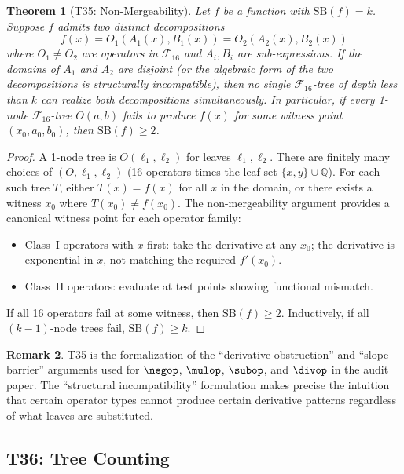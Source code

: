 \documentclass[12pt,a4paper]{article}
\newtheorem{theorem}{Theorem}[section]
\theoremstyle{definition}
\newtheorem{remark}[theorem]{Remark}
\newcommand{\F}{\mathcal{F}_{16}}
\newcommand{\SB}{\mathrm{SB}}
\begin{document}
\begin{theorem}[T35: Non-Mergeability]
\label{thm:T35}
Let $f$ be a function with $\SB(f) = k$.  Suppose $f$ admits two distinct
decompositions
\[
  f(x) = O_1(A_1(x), B_1(x)) = O_2(A_2(x), B_2(x))
\]
where $O_1 \ne O_2$ are operators in $\F$ and $A_i, B_i$ are sub-expressions.
If the domains of $A_1$ and $A_2$ are disjoint (or the algebraic form of the
two decompositions is structurally incompatible), then no single $\F$-tree
of depth less than $k$ can realize both decompositions simultaneously.
In particular, if every 1-node $\F$-tree $O(a,b)$ fails to produce $f(x)$
for some witness point $(x_0,a_0,b_0)$, then $\SB(f) \ge 2$.
\end{theorem}

\begin{proof}
A 1-node tree is $O(\ell_1, \ell_2)$ for leaves $\ell_1, \ell_2$.  There
are finitely many choices of $(O, \ell_1, \ell_2)$ (16 operators times the
leaf set $\{x, y\} \cup \mathbb{Q}$).  For each such tree $T$, either
$T(x) = f(x)$ for all $x$ in the domain, or there exists a witness $x_0$
where $T(x_0) \ne f(x_0)$.  The non-mergeability argument provides a canonical
witness point for each operator family:
\begin{itemize}
  \item Class~I operators with $x$ first: take the derivative at any $x_0$;
    the derivative is exponential in $x$, not matching the required $f'(x_0)$.
  \item Class~II operators: evaluate at test points showing functional mismatch.
\end{itemize}
If all 16 operators fail at some witness, then $\SB(f) \ge 2$.  Inductively,
if all $(k-1)$-node trees fail, $\SB(f) \ge k$.
\end{proof}

\begin{remark}
T35 is the formalization of the ``derivative obstruction'' and ``slope barrier''
arguments used for $\negop$, $\mulop$, $\subop$, and $\divop$ in the audit paper.
The ``structural incompatibility'' formulation makes precise the intuition that
certain operator types cannot produce certain derivative patterns regardless
of what leaves are substituted.
\end{remark}

\subsection{T36: Tree Counting}
\end{document}
